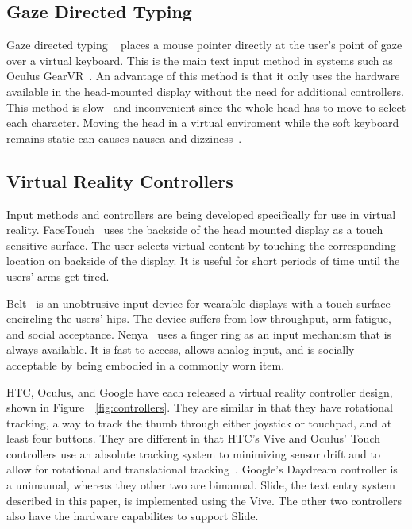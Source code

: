 \subsection{Gaze Directed Typing}
Gaze directed typing ~\cite{majaranta2009text} places a mouse pointer directly at the user's point of gaze over a virtual keyboard.
This is the main text input method in systems such as Oculus GearVR~\cite{hecht2016optical}.
An advantage of this method is that it only uses the hardware available in the head-mounted display without the need for additional controllers.
This method is slow~\cite{majaranta2002twenty, card1983psychology, mackenzie1992fitts} and inconvenient since the whole head has to move to select each character.
Moving the head in a virtual enviroment while the soft keyboard remains static can causes nausea and dizziness~\cite{atienza2016interaction}.

\subsection{Virtual Reality Controllers}
Input methods and controllers are being developed specifically for use in virtual reality.
FaceTouch~\cite{Gugenheimer:2016:FTI:2851581.2890242} uses the backside of the head mounted display as a touch sensitive surface.
The user selects virtual content by touching the corresponding location on backside of the display.
It is useful for short periods of time until the users' arms get tired.

Belt~\cite{dobbelstein2015belt} is an unobtrusive input device for wearable displays with a touch surface encircling the users' hips.
The device suffers from low throughput, arm fatigue, and social acceptance.
Nenya~\cite{ashbrook2011nenya} uses a finger ring as an input mechanism that is always available.
It is fast to access, allows analog input, and is socially acceptable by being embodied in a commonly worn item.

HTC, Oculus, and Google have each released a virtual reality controller design, shown in Figure~~\ref{fig:controllers}.
They are similar in that they have rotational tracking, a way to track the thumb through either joystick or touchpad, and at least four buttons.
They are different in that HTC's Vive and Oculus' Touch controllers use an absolute tracking system to minimizing sensor drift and to allow for rotational and translational tracking~\cite{hilfert2016low}.
Google's Daydream controller is a unimanual, whereas they other two are bimanual.
Slide, the text entry system described in this paper, is implemented using the Vive.
The other two controllers also have the hardware capabilites to support Slide.


